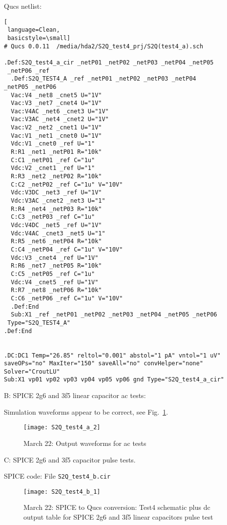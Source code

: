 \newpage 
Qucs netlist:
\begin{lstlisting}[
 language=Clean, 
 basicstyle=\small]
# Qucs 0.0.11  /media/hda2/S2Q_test4_prj/S2Q(test4_a).sch

.Def:S2Q_test4_a_cir _netP01 _netP02 _netP03 _netP04 _netP05
 _netP06 _ref
  .Def:S2Q_TEST4_A _ref _netP01 _netP02 _netP03 _netP04 
_netP05 _netP06
  Vac:V4 _net8 _cnet5 U="1V"
  Vac:V3 _net7 _cnet4 U="1V"
  Vac:V4AC _net6 _cnet3 U="1V"
  Vac:V3AC _net4 _cnet2 U="1V"
  Vac:V2 _net2 _cnet1 U="1V"
  Vac:V1 _net1 _cnet0 U="1V"
  Vdc:V1 _cnet0 _ref U="1"
  R:R1 _net1 _netP01 R="10k"
  C:C1 _netP01 _ref C="1u"
  Vdc:V2 _cnet1 _ref U="1"
  R:R3 _net2 _netP02 R="10k"
  C:C2 _netP02 _ref C="1u" V="10V"
  Vdc:V3DC _net3 _ref U="1V"
  Vdc:V3AC _cnet2 _net3 U="1"
  R:R4 _net4 _netP03 R="10k"
  C:C3 _netP03 _ref C="1u"
  Vdc:V4DC _net5 _ref U="1V"
  Vdc:V4AC _cnet3 _net5 U="1"
  R:R5 _net6 _netP04 R="10k"
  C:C4 _netP04 _ref C="1u" V="10V"
  Vdc:V3 _cnet4 _ref U="1V"
  R:R6 _net7 _netP05 R="10k"
  C:C5 _netP05 _ref C="1u"
  Vdc:V4 _cnet5 _ref U="1V"
  R:R7 _net8 _netP06 R="10k"
  C:C6 _netP06 _ref C="1u" V="10V"
  .Def:End
  Sub:X1 _ref _netP01 _netP02 _netP03 _netP04 _netP05 _netP06
 Type="S2Q_TEST4_A"
.Def:End


.DC:DC1 Temp="26.85" reltol="0.001" abstol="1 pA" vntol="1 uV" 
saveOPs="no" MaxIter="150" saveAll="no" convHelper="none" Solver="CroutLU"
Sub:X1 vp01 vp02 vp03 vp04 vp05 vp06 gnd Type="S2Q_test4_a_cir"

\end{lstlisting}



\begin{flushleft}
\newpage 
B: SPICE 2g6 and 3f5 linear capacitor ac tests:


Simulation waveforms appear to be correct, see Fig.~\ref{fig:S2Qtest4_3}.

\begin{figure}
  \centering
  \texttt{[image: S2Q\_test4\_a\_2]}
  \caption{March 22: Output waveforms for ac tests}
  \label{fig:S2Qtest4_3}
\end{figure} 

\end{flushleft}


\begin{flushleft}
C: SPICE 2g6 and 3f5 capacitor pulse tests.


SPICE code: File \verb|S2Q_test4_b.cir|

\begin{figure}
  \centering
  \texttt{[image: S2Q\_test4\_b\_1]}
  \caption{March 22: SPICE to Qucs conversion: Test4 schematic plus dc output table for SPICE 2g6 and 3f5 linear capacitors pulse test}
  \label{fig:S2Qtest4_4}
\end{figure} 


\end{flushleft}

